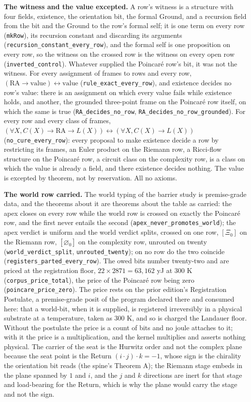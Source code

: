\documentclass[10pt]{article}
\begin{document}
\textbf{The witness and the value excepted.} A row's witness is a
structure with four fields, existence, the orientation bit, the formal
Ground, and a recursion field from the bit and the Ground to the row's
formal self; it is one term on every row (\texttt{mkRow}), its recursion
constant and discarding its arguments
(\texttt{recursion\_constant\_every\_row}), and the formal self is one
proposition on every row, so the witness on the crossed row is the
witness on every open row (\texttt{inverted\_control}). Whatever
supplied the Poincaré row's bit, it was not the witness. For every
assignment of frames to rows and every row,
\((\mathrm{RA} \to \mathrm{value}) \leftrightarrow \mathrm{value}\)
(\texttt{rule\_exact\_every\_row}), and existence decides no row's
value: there is an assignment on which every value fails while existence
holds, and another, the grounded three-point frame on the Poincaré row
itself, on which the same is true (\texttt{RA\_decides\_no\_row},
\texttt{RA\_decides\_no\_row\_grounded}). For every row and every class
of frames,
\((\forall X, C(X) \to \mathrm{RA} \to L(X)) \leftrightarrow (\forall X, C(X) \to L(X))\)
(\texttt{no\_cure\_every\_row}): every proposal to make existence decide
a row by restricting its frames, an Euler product on the Riemann row, a
Ricci-flow structure on the Poincaré row, a circuit class on the
complexity row, is a class on which the value is already a field, and
there existence decides nothing. The value is excepted by theorem, not
by reservation. All no axioms.

\textbf{The world row carried.} The world typing of the barrier study is
premise-grade data, and the theorems about it are theorems about the
table as carried: the apex closes on every row while the world row is
crossed on exactly the Poincaré row, and the first never entails the
second (\texttt{apex\_never\_promotes\_world}); the apex verdict is
uniform and the world verdict splits, crossed on one row, \([\Xi_0]\) on
the Riemann row, \([\varnothing_0]\) on the complexity row, unrouted on
twenty (\texttt{world\_verdict\_split}, \texttt{unrouted\_twenty}); on
no row do the two coincide (\texttt{registers\_parted\_every\_row}). The
owed bits number twenty-two and are priced at the registration floor,
\(22 \times 2871 = 63{,}162\) yJ at \(300\) K
(\texttt{corpus\_price\_total}), the price of the Poincaré row being
zero (\texttt{poincare\_price\_zero}). The price rests on the prior
edition's Registration Postulate, a premise-grade posit of the program
declared there and consumed here: that a world-bit, when it is supplied,
is registered irreversibly in a physical substrate at a temperature,
taken as \(300\) K, and so is charged the Landauer floor. Without the
postulate the price is a count of bits and no joule attaches to it; with
it the price is a multiplication, and the kernel multiplies and asserts
nothing physical. The carrier of the seat is the Hurwitz order and not
the complex plane because the seat point is the Return
\((i \cdot j) \cdot k = -1\), whose sign is the chirality the
orientation bit reads (the spine's Theorem A); the Riemann stage embeds
in the plane spanned by \(1\) and \(i\), and the \(j\) and \(k\)
directions are inert for that stage and load-bearing for the Return,
which is why the plane would carry the stage and not the sign.
\end{document}

